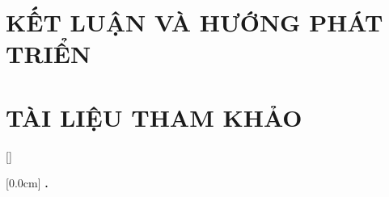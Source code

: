 \documentclass[a4paper,13pt,3p,twoside]{report}
\renewcommand{\bibname}{Danh_sach_tai_lieu_tham_khao}
\theoremstyle{definition}
\begin{document}
\chapter{KẾT LUẬN VÀ HƯỚNG PHÁT TRIỂN} %
\label{chapter:conclusion}


\newpage
\chapter*{TÀI LIỆU THAM KHẢO} %
\label{chapter:reference}



\newpage
\renewcommand\bibname{TÀI LIỆU THAM KHẢO}
\printbibliography
{}

\appendixpage
\appendices
\addappheadtotoc


{}[]
\titlespacing*{\chapter}{0pt}{-20pt}{20pt}

    [0.0cm]             %
    {\bfseries\vspace{0.3cm}}                  %
    {{\bfseries{\scshape} \thecontentslabel.\ }} %
    {}         %
    {\contentspage}         %

\end{document}

